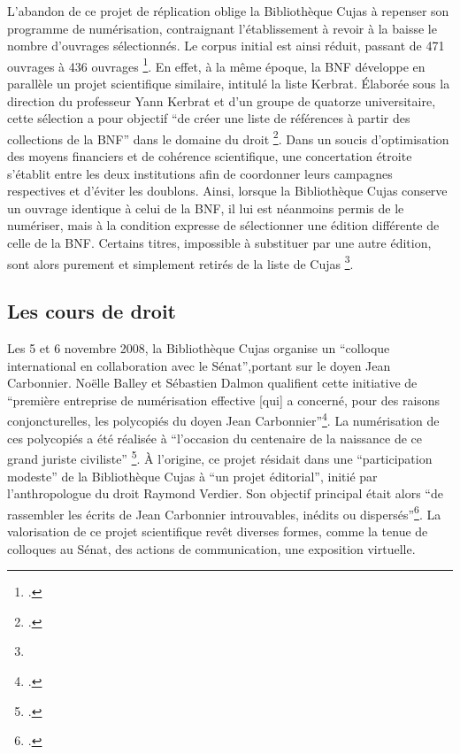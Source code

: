 L'abandon de ce projet de réplication oblige la Bibliothèque Cujas à repenser son programme de numérisation, contraignant l'établissement à revoir à la baisse le nombre d'ouvrages sélectionnés. Le corpus initial est ainsi réduit, passant de 471 ouvrages à 436 ouvrages \footcite{2007RefonteProgramme}. En effet, à la même époque, la \ac{BNF} développe en parallèle un projet scientifique similaire, intitulé la liste Kerbrat. Élaborée sous la direction du professeur Yann Kerbrat et d'un groupe de quatorze universitaire, cette sélection a pour objectif \enquote{de créer une liste de références à partir des collections de la BNF} dans le domaine du droit \footcite{2007RefonteProgramme}. Dans un soucis d'optimisation des moyens financiers et de cohérence scientifique, une concertation étroite s'établit entre les deux institutions afin de coordonner leurs campagnes respectives et d'éviter les doublons. Ainsi, lorsque la Bibliothèque Cujas conserve un ouvrage identique à celui de la \ac{BNF}, il lui est néanmoins permis de le numériser, mais à la condition expresse de sélectionner une édition différente de celle de la \ac{BNF}. Certains titres, impossible à substituer par une autre édition, sont alors purement et simplement retirés de la liste de Cujas \footnote{}. 

\subsection{Les cours de droit}
Les 5 et 6 novembre 2008, la Bibliothèque Cujas organise un \enquote{colloque international en collaboration avec le Sénat},portant sur le doyen Jean Carbonnier. Noëlle Balley et Sébastien Dalmon qualifient cette initiative de \enquote{première entreprise de numérisation effective [qui] a concerné, pour des raisons conjoncturelles, les polycopiés du doyen Jean Carbonnier}\footcite{balley4ExempleMediation2012}. La numérisation de ces polycopiés a été réalisée à \enquote{l'occasion du centenaire de la naissance de ce grand juriste civiliste} \footcite{balley4ExempleMediation2012}. À l'origine, ce projet résidait dans une \enquote{participation modeste} de la Bibliothèque Cujas à \enquote{un projet éditorial}, initié par l'anthropologue du droit Raymond Verdier. Son objectif principal était alors \enquote{de rassembler les écrits de Jean Carbonnier introuvables, inédits ou dispersés}\footcite{balley4ExempleMediation2012}. La valorisation de ce projet scientifique revêt diverses formes, comme la tenue de colloques au Sénat, des actions de communication, une exposition virtuelle.

